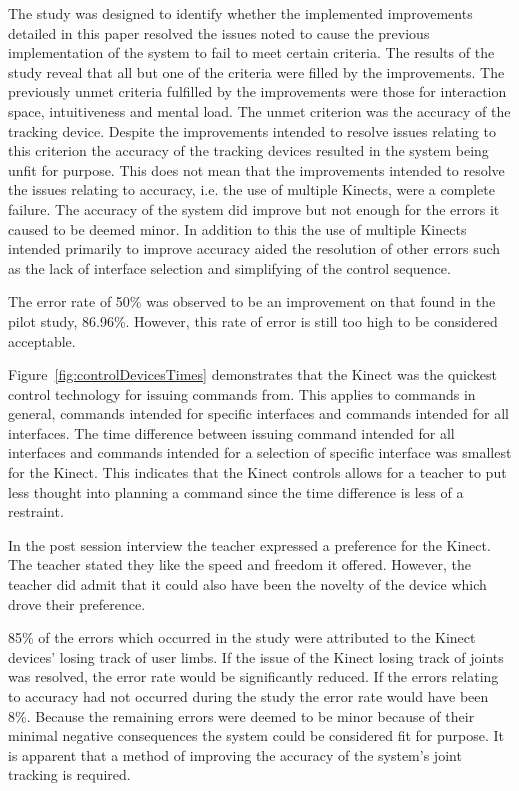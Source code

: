 \documentclass[link]{IWCOMP}
\begin{document}
The study was designed to identify whether the implemented improvements detailed in this paper resolved the issues noted to cause the previous implementation of the system to fail to meet certain criteria.
The results of the study reveal that all but one of the criteria were filled by the improvements.
The previously unmet criteria fulfilled by the improvements were those for interaction space, intuitiveness and mental load.
The unmet criterion was the accuracy of the tracking device.
Despite the improvements intended to resolve issues relating to this criterion the accuracy of the tracking devices resulted in the system being unfit for purpose.
This does not mean that the improvements intended to resolve the issues relating to accuracy, i.e. the use of multiple Kinects, were a complete failure.
The accuracy of the system did improve but not enough for the errors it caused to be deemed minor.
In addition to this the use of multiple Kinects intended primarily to improve accuracy aided the resolution of other errors such as the lack of interface selection and simplifying of the control sequence.

The error rate of 50\% was observed to be an improvement on that found in the pilot study, 86.96\%.
However, this rate of error is still too high to be considered acceptable.

Figure~\ref{fig:controlDevicesTimes} demonstrates that the Kinect was the quickest control technology for issuing commands from.
This applies to commands in general, commands intended for specific interfaces and commands intended for all interfaces.
The time difference between issuing command intended for all interfaces and commands intended for a selection of specific interface was smallest for the Kinect.
This indicates that the Kinect controls allows for a teacher to put less thought into planning a command since the time difference is less of a restraint.

In the post session interview the teacher expressed a preference for the Kinect.
The teacher stated they like the speed and freedom it offered.
However, the teacher did admit that it could also have been the novelty of the device which drove their preference.

85\% of the errors which occurred in the study were attributed to the Kinect devices' losing track of user limbs.
If the issue of the Kinect losing track of joints was resolved, the error rate would be significantly reduced.
If the errors relating to accuracy had not occurred during the study the error rate would have been 8\%.
Because the remaining errors were deemed to be minor because of their minimal negative consequences the system could be considered fit for purpose.
It is apparent that a method of improving the accuracy of the system's joint tracking is required.
\end{document}
